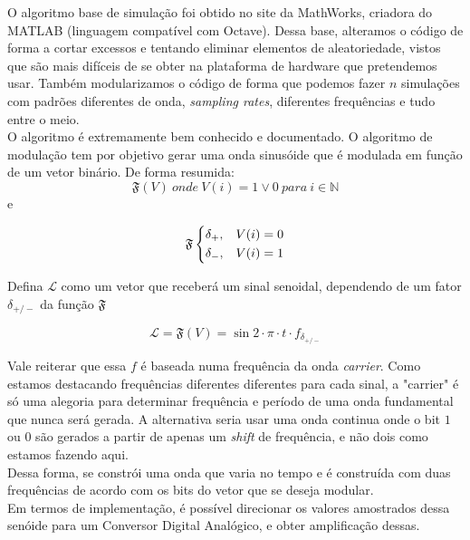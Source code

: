 \documentclass[11pt,a4paper]{report}
\begin{document}
	O algoritmo base de simulação foi obtido no site da MathWorks, criadora do MATLAB (linguagem compatível com Octave). Dessa base, alteramos o código de forma a cortar excessos e tentando eliminar elementos de aleatoriedade, vistos que são mais difíceis de se obter na plataforma de hardware que pretendemos usar. Também modularizamos o código de forma que podemos fazer $n$ simulações com padrões diferentes de onda, {\it sampling rates}, diferentes frequências e tudo entre o meio.\\
	
	O algoritmo é extremamente bem conhecido e documentado. O algoritmo de modulação tem por objetivo gerar uma onda sinusóide que é modulada em função de um vetor binário. De forma resumida:
	\begin{equation}
	\mathfrak{F}(V)\ onde\ V(i) = 1 \lor 0\ para\ i \in \mathbb{N}
	\end{equation}
	e

	\[
	\mathfrak{F}
	\begin{dcases}
	\delta_{+}, & V(i) = 0 \\
	\delta_{-}, & V(i) = 1 \\
	\end{dcases}
	\]


	Defina $\mathcal{L}$ como um vetor que receberá um sinal senoidal, dependendo de um fator $\delta_{+/-}$ da função $\mathfrak{F}$

	\begin{equation}
	\mathcal{L} = \mathfrak{F}(V) = \sin{2 \cdot \pi \cdot t \cdot f_{\delta_{+/-}}}
	\end{equation}
	
	Vale reiterar que essa $f$ é baseada numa frequência da onda {\it carrier}. Como estamos destacando frequências diferentes diferentes para cada sinal, a "carrier" é só uma alegoria para determinar frequência e período de uma onda fundamental que nunca será gerada. A alternativa seria usar uma onda continua onde o bit $1$ ou $0$ são gerados a partir de apenas um {\it shift} de frequência, e não dois como estamos fazendo aqui.\\
	
	Dessa forma, se constrói uma onda que varia no tempo e é construída com duas frequências de acordo com os bits do vetor que se deseja modular.\\
	
	Em termos de implementação, é possível direcionar os valores amostrados dessa senóide para um Conversor Digital Analógico, e obter amplificação dessas.\\
	
\end{document}
